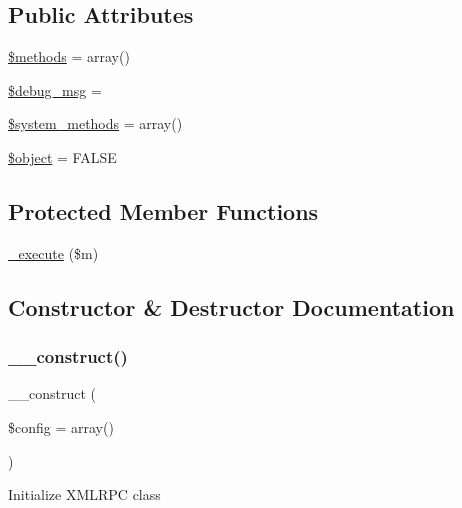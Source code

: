 \subsection*{Public Attributes}
\begin{DoxyCompactItemize}
\item 
\mbox{\hyperlink{class_c_i___xmlrpcs_a802753499268a04da139bd6e6ef89b35}{\$methods}} = array()
\item 
\mbox{\hyperlink{class_c_i___xmlrpcs_afed2f9c39f2e406bcdff222ce412bda8}{\$debug\+\_\+msg}} = \textquotesingle{}\textquotesingle{}
\item 
\mbox{\hyperlink{class_c_i___xmlrpcs_a07c837152d76c5e72b0bd7a065fa9c10}{\$system\+\_\+methods}} = array()
\item 
\mbox{\hyperlink{class_c_i___xmlrpcs_a52123b83a1952a68c5513e47d59ec4a6}{\$object}} = F\+A\+L\+SE
\end{DoxyCompactItemize}
\subsection*{Protected Member Functions}
\begin{DoxyCompactItemize}
\item 
\mbox{\hyperlink{class_c_i___xmlrpcs_a2f039adb8ec59c693300993c95138b46}{\+\_\+execute}} (\$m)
\end{DoxyCompactItemize}


\subsection{Constructor \& Destructor Documentation}
\mbox{\label{class_c_i___xmlrpcs_af7f9493844d2d66e924e3c1df51ce616}} 
\subsubsection{\texorpdfstring{\+\_\+\+\_\+construct()}{\_\_construct()}}
{\footnotesize\ttfamily \+\_\+\+\_\+construct (\begin{DoxyParamCaption}\item[{}]{\$config = {\ttfamily array()} }\end{DoxyParamCaption})}

Initialize X\+M\+L\+R\+PC class


